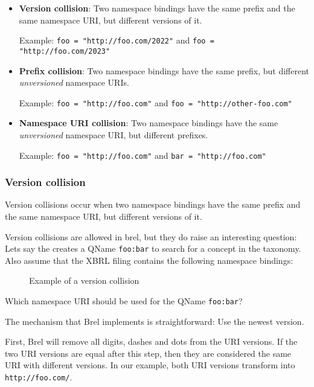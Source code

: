 \begin{itemize}
    \item \textbf{Version collision}: Two namespace bindings have the same prefix and the same namespace URI, but different versions of it.
    
    Example: \texttt{foo = "http://foo.com/2022"} and \texttt{foo = "http://foo.com/2023"}
    \item \textbf{Prefix collision}: Two namespace bindings have the same prefix, but different \textit{unversioned} namespace URIs.
    
    Example: \texttt{foo = "http://foo.com"} and \texttt{foo = "http://other-foo.com"}
    \item \textbf{Namespace URI collision}: Two namespace bindings have the same \textit{unversioned} namespace URI, but different prefixes.
    
    Example: \texttt{foo = "http://foo.com"} and \texttt{bar = "http://foo.com"}
\end{itemize}

\subsubsection{Version collision}

Version collisions occur when two namespace bindings have the same prefix and the same namespace URI, but different versions of it.

Version collisions are allowed in brel, but they do raise an interesting question:
Lets say the creates a QName \texttt{foo:bar} to search for a concept in the taxonomy. 
Also assume that the XBRL filing contains the following namespace bindings:

\begin{figure}[H]
    \caption{Example of a version collision}
    \label{fig:version_collision_example}
\end{figure}

Which namespace URI should be used for the QName \texttt{foo:bar}?

The mechanism that Brel implements is straightforward: Use the newest version.

First, Brel will remove all digits, dashes and dots from the URI versions. 
If the two URI versions are equal after this step, then they are considered the same URI with different versions.
In our example, both URI versions transform into \texttt{http://foo.com/}.

